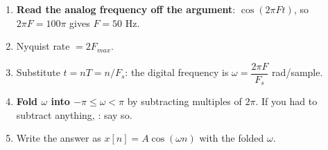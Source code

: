 \begin{enumerate}
  \item \textbf{Read the analog frequency off the argument}: $\cos(2\pi Ft)$, so
        $2\pi F=100\pi$ gives $F=50$ Hz. 
  \item Nyquist rate $=2F_{max}$.
  \item Substitute $t=nT=n/F_s$: the digital frequency is
        $\omega=\dfrac{2\pi F}{F_s}$ rad/sample.
  \item \textbf{Fold $\omega$ into $-\pi\le\omega<\pi$} by subtracting multiples of
        $2\pi$. If you had to subtract anything, : say so.
  \item Write the answer as $x[n]=A\cos(\omega n)$ with the folded $\omega$.
\end{enumerate}

